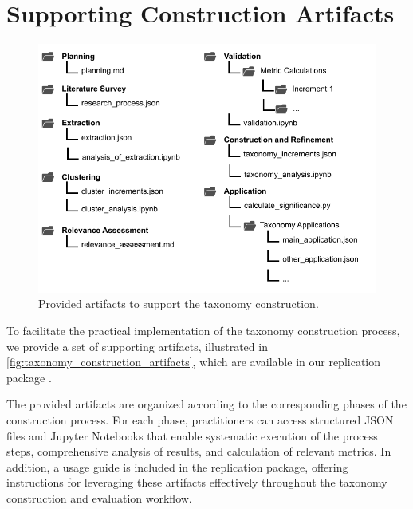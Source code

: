 
\section{Supporting Construction Artifacts}

\begin{figure}
    \centering
    \includegraphics[width=0.7\linewidth]{figures/question_catalog/taxonomy-taxonomy_artifacts.drawio.pdf}
    \caption[Taxonomy Construction Artifacts]{Provided artifacts to support the taxonomy construction.}
    \label{fig:taxonomy_construction_artifacts}
\end{figure}

To facilitate the practical implementation of the taxonomy construction process, we provide a set of supporting artifacts, illustrated in \autoref{fig:taxonomy_construction_artifacts}, which are available in our replication package \cite{schneider_replication_2025}.

The provided artifacts are organized according to the corresponding phases of the construction process. For each phase, practitioners can access structured JSON files and Jupyter Notebooks that enable systematic execution of the process steps, comprehensive analysis of results, and calculation of relevant metrics. In addition, a usage guide is included in the replication package, offering instructions for leveraging these artifacts effectively throughout the taxonomy construction and evaluation workflow.